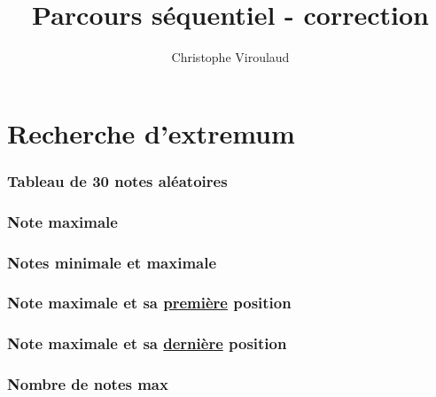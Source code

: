 \documentclass[svgnames,11pt]{beamer}
\author[]{Christophe Viroulaud}
\title{Parcours séquentiel - correction}
\date{}
\institute{Première NSI}
\begin{document}
\begin{frame}
    \titlepage
\end{frame}
\section{Recherche d'extremum}
\begin{frame}
    \frametitle{Tableau de 30 notes aléatoires}

    

\end{frame}
\begin{frame}
    \frametitle{Note maximale}

    

\end{frame}

\begin{frame}
    \frametitle{Notes minimale et maximale}

    

\end{frame}

\begin{frame}
    \frametitle{Note maximale et sa \underline{première} position}

    

\end{frame}

\begin{frame}
    \frametitle{Note maximale et sa \underline{dernière} position}

    

\end{frame}

\begin{frame}
    \frametitle{Nombre de notes max}

    

\end{frame}
\end{document}
